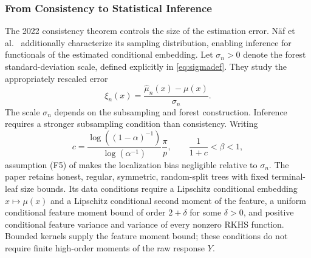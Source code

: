 \documentclass[12pt,a4paper]{article}
\newcommand{\1}{\mathbf 1}
\begin{document}
\subsubsection{From Consistency to Statistical Inference}
The 2022 consistency theorem controls the size of the estimation error. N\"af et al.\ \cite{naf2023} additionally characterize its sampling distribution, enabling inference for functionals of the estimated conditional embedding. Let $\sigma_n>0$ denote the forest standard-deviation scale, defined explicitly in \eqref{eq:sigmadef}. They study the appropriately rescaled error
\begin{equation}\label{eq:xi}
 \xi_n(x)=\frac{\widehat\mu_n(x)-\mu(x)}{\sigma_n}.
\end{equation}
The scale $\sigma_n$ depends on the subsampling and forest construction. Inference requires a stronger subsampling condition than consistency. Writing
\begin{equation}\label{eq:inferencebeta}
 c=\frac{\log((1-\alpha)^{-1})}{\log(\alpha^{-1})}\frac{\pi}{p},
 \qquad \frac{1}{1+c}<\beta<1,
\end{equation}
assumption (F5) of \cite{naf2023} makes the localization bias negligible relative to $\sigma_n$. The paper retains honest, regular, symmetric, random-split trees with fixed terminal-leaf size bounds. Its data conditions require a Lipschitz conditional embedding $x\mapsto\mu(x)$ and a Lipschitz conditional second moment of the feature, a uniform conditional feature moment bound of order $2+\delta$ for some $\delta>0$, and positive conditional feature variance and variance of every nonzero RKHS function. Bounded kernels supply the feature moment bound; these conditions do not require finite high-order moments of the raw response $Y$.
\end{document}
